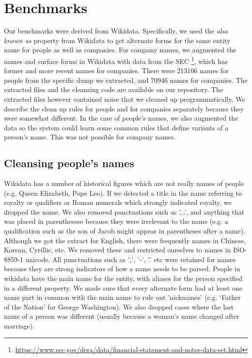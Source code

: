 \section{Benchmarks}
\label{datasets}
Our benchmarks were derived from Wikidata.  Specifically, we used the \textit{also known as} property from Wikidata to get alternate forms for the same entity name for people as well as companies.  For company names, we augmented the names and surface forms in Wikidata with data from the SEC \footnote{\url{https://www.sec.gov/dera/data/financial-statement-and-notes-data-set.html}}, which has former and more recent names for companies.  There were 213106 names for people from the specific dump we extracted, and 70946 names for companies.  The extracted files and the cleansing code are available on our repository. The extracted files however contained noise that we cleaned up programmatically.  We describe the clean up rules for people and for companies separately because they were somewhat different.  In the case of people's names, we also augmented the data so the system could learn some common rules that define variants of a person's name.  This was not possible for company names.

\subsection{Cleansing people's names}
Wikidata has a number of historical figures which are not really names of people (e.g. Queen Elizabeth, Pope Leo).  If we detected a title in the name referring to royalty or qualifiers or Roman numerals which strongly indicated royalty, we dropped the name.  We also removed punctuations such as '...', and anything that was placed in parenthesese because they were irrelevant to the name (e.g. a qualification such as the son of Jacob might appear in parentheses after a name).  Although we got the extract for English, there were frequently names in Chinese, Korean, Cyrillic, etc.  We removed these and restricted ourselves to names in ISO-8859-1 unicode.  All punctuations such as ',', '-', '.' etc were retained for names because they are strong indicators of how a name needs to be parsed.  People in wikidata have the main name for the entity, with aliases for the person specified in a different property.  We made sure that every alternate form had at least one name part in common with the main name to rule out 'nicknames' (e.g. `Father of the Nation' for George Washington).  We also dropped cases where the last name of a person was different (usually because a woman's name changed after marriage).      

